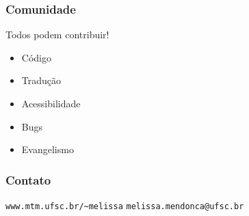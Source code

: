 \documentclass{beamer}
\begin{document}
\begin{frame}
   \frametitle{Comunidade}
   Todos podem contribuir!
   \begin{itemize}
   \item Código
   \item Tradução
   \item Acessibilidade
   \item Bugs
   \item Evangelismo
   \end{itemize}
\end{frame}

\begin{frame}[fragile]
  \frametitle{Contato}
  \begin{center}
    \begin{minipage}{0.7\textwidth}
      \begin{block}{}
        \begin{center}
          \verb+www.mtm.ufsc.br/~melissa+
          \verb+melissa.mendonca@ufsc.br+
        \end{center}
      \end{block}
    \end{minipage}
  \end{center}
\end{frame}
\end{document}
